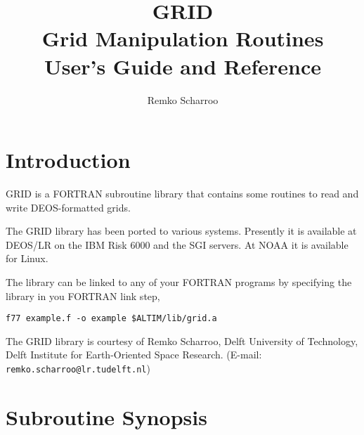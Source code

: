\documentclass[a4paper]{article}
\title{GRID \\ Grid Manipulation Routines \\
User's Guide and Reference}
\author{Remko Scharroo}
\def\Input#1{\vbox{}}
\begin{document}
\tableofcontents

\section{Introduction}
GRID is a FORTRAN subroutine library that contains some routines to
read and write DEOS-formatted grids.

The GRID library has been ported to various systems.
Presently it is available at DEOS/LR on the IBM Risk 6000 and the SGI
servers. At NOAA it is available for Linux.

The library can be linked to any of your
FORTRAN programs by specifying the library in you FORTRAN link step, \eg
\begin{verbatim}
f77 example.f -o example $ALTIM/lib/grid.a
\end{verbatim}

The GRID library is courtesy of Remko Scharroo, Delft University of
Technology, Delft Institute for Earth-Oriented Space Research.
(E-mail: {\tt remko.scharroo@lr.tudelft.nl})

\section{Subroutine Synopsis}
\Input{dyntopo}
\Input{gr1int4}
\Input{gr1int8}
\Input{gr2int4}
\Input{gr2int8}
\Input{gr3int4}
\Input{gr3int8}

\Input{gridbinf}
\Input{gridbinq}
\Input{gridbint}
\Input{gridbspl}
\Input{gridbuff}
\Input{gridcog4}
\Input{gridcog8}
\Input{griddx}
\Input{griddy}
\Input{gridrd4}
\Input{gridrd8}
\Input{gridwr4}
\Input{gridwr8}
\Input{grillu}
\Input{grstat4}
\Input{grstat8}
\Input{grwint4}
\Input{grwint8}
\Input{maskbinf}
\Input{maskbint}
\Input{maskbuff}


\end{document}
